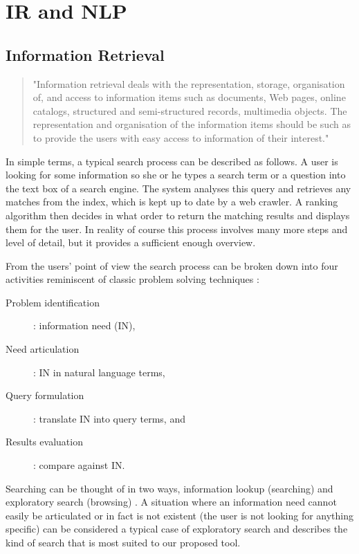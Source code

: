 
\chapter{IR and NLP}
\label{ch:irnlp}

\section{Information Retrieval}

\begin{quote}
  "Information retrieval deals with the representation, storage, organisation of, and access to information items such as documents, Web pages, online catalogs, structured and semi-structured records, multimedia objects. The representation and organisation of the information items should be such as to provide the users with easy access to information of their interest." \citep{Baeza-Yates2011}
\end{quote}

In simple terms, a typical search process can be described as follows. A user is looking for some information so she or he types a search term or a question into the text box of a search engine. The system analyses this query and retrieves any matches from the index, which is kept up to date by a web crawler. A ranking algorithm then decides in what order to return the matching results and displays them for the user. In reality of course this process involves many more steps and level of detail, but it provides a sufficient enough overview.

From the users' point of view the search process can be broken down into four activities \citep{Sutcliffe1998} reminiscent of classic problem solving techniques \citep{Polya1957}:

\begin{description}
  \item [Problem identification]: information need (IN),
  \item [Need articulation]: IN in natural language terms,
  \item [Query formulation]: translate IN into query terms, and
  \item [Results evaluation]: compare against IN.
\end{description}

Searching can be thought of in two ways, information lookup (searching) and exploratory search (browsing) \citep{DeVries1993,Marchionini2006}. A situation where an information need cannot easily be articulated or in fact is not existent (the user is not looking for anything specific) can be considered a typical case of exploratory search and describes the kind of search that is most suited to our proposed tool.

